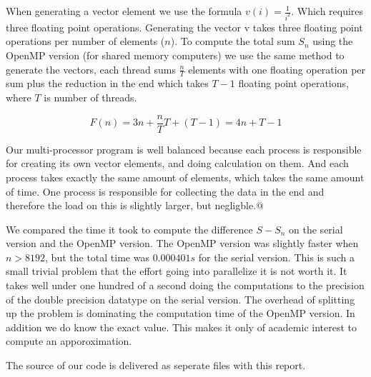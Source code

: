 \documentclass{article}
\begin{document}
    When generating a vector element we use the formula $ v(i) = \frac{1}{i^2}$. Which requires three floating point operations. Generating the vector v takes three floating point operations per number of elements ($n$). To compute the total sum $S_n$ using the OpenMP version (for shared memory computers) we use the same method to generate the vectors, each thread sums $\frac{n}{T}$ elements with one floating operation per sum plus the reduction in the end which takes $T-1$ floating point operations, where $T$ is number of threads.

    $$ F(n) = 3n + \frac{n}{T}T+(T-1) = 4n + T - 1 $$

    Our multi-processor program is well balanced because each process is responsible for creating its own vector elements, and doing calculation on them. And each process takes exactly the same amount of elements, which takes the same amount of time. One process is responsible for collecting the data in the end and therefore the load on this is slightly larger, but negligble.@

    We compared the time it took to compute the difference $ S - S_n $ on the serial version and the OpenMP version. The OpenMP version was slightly faster when $n>8192$, but the total time was $0.000401s$  for the serial version. This is such a small trivial problem that the effort going into parallelize it is not worth it. It takes well under one hundred of a second doing the computations to the precision of the double precision datatype on the serial version. The overhead of splitting up the problem is dominating the computation time of the OpenMP version. In addition we do know the exact value. This makes it only of academic interest to compute an apporoximation.

    The source of our code is delivered as seperate files with this report.


\end{document}
